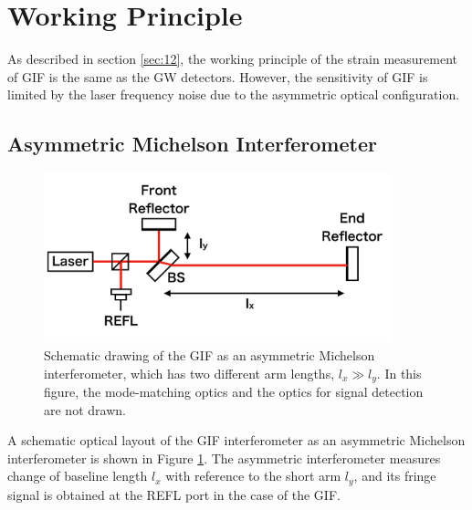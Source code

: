 \section{Working Principle} \label{sec:sec42}
As described in section \cref{sec:12}, the working principle of the strain measurement of GIF is the same as the GW detectors. However, the sensitivity of GIF is limited by the laser frequency noise due to the asymmetric optical configuration.
\subsection{Asymmetric Michelson Interferometer}
\begin{figure}[h]
  \centering
  \includegraphics[width=10.0cm]{./img_chap4/img401.png}
  \caption{Schematic drawing of the GIF as an asymmetric Michelson interferometer, which has two different arm lengths, $l_x\gg{l_y}$. In this figure, the mode-matching optics and the optics for signal detection are not drawn.} \label{img:img401}
\end{figure}
A schematic optical layout of the GIF interferometer as an asymmetric Michelson interferometer is shown in Figure  \ref{img:img401}. The asymmetric interferometer measures change of baseline length $l_x$ with reference to the short arm $l_y$, and its fringe signal is obtained at the REFL port in the case of the GIF.

